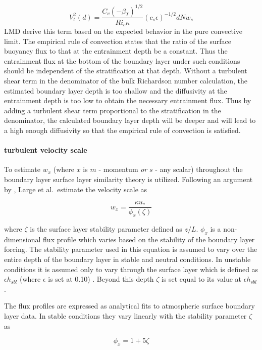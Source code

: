 \begin{equation}
  V_{t}^{2}(d)=\frac{C_v(-\beta_T)^{1/2}}{Ri_c
  \kappa}(c_s\epsilon)^{-1/2}dNw_s
\end{equation}
LMD derive this term based on the expected behavior in the pure
convective limit.  The empirical rule of convection states that the
ratio of the surface buoyancy flux to that at the entrainment depth be 
a constant.  Thus the entrainment flux at the
bottom of the boundary layer under such conditions should be
independent of the stratification at that depth.  Without a turbulent
shear term in the denominator of the bulk Richardson number
calculation, the estimated boundary layer depth is too shallow and the
diffusivity at the entrainment depth is too low to obtain the
necessary entrainment flux.  Thus by adding a turbulent shear term
proportional to the stratification in the denominator, the calculated
boundary layer depth will be deeper and will lead to a high enough
diffusivity so that the empirical rule of convection is satisfied.
  
\paragraph{turbulent velocity scale}
To estimate $w_x$ (where $x$ is $m$ - momentum {\em or} $s$
- any scalar) throughout the boundary layer surface layer similarity
theory is utilized.  Following an argument by
\citet{TM86}, Large et al.\ estimate the velocity scale as

\begin{equation}
w_x=\frac{\kappa u_*}{\phi_x(\zeta)}
\end{equation}

where $\zeta$ is the surface layer stability parameter defined as
$z/L$.  $\phi_x$ is a non-dimensional flux profile which varies based
on the stability of the boundary layer forcing.  The stability
parameter used in this equation is assumed to vary over the entire
depth of the boundary layer in stable and neutral conditions.  In
unstable conditions it is assumed only to vary through the surface
layer which is defined as $ \epsilon h_{sbl} $ (where $\epsilon$ is
set at 0.10) .  Beyond this depth $\zeta$
is set equal to its value at $ \epsilon h_{sbl} $.

The flux profiles are expressed as analytical fits to atmospheric
surface boundary layer data.  In stable conditions they vary linearly
with the stability parameter $\zeta$  as

\begin{equation}
\phi_x=1+5\zeta
\end{equation}

